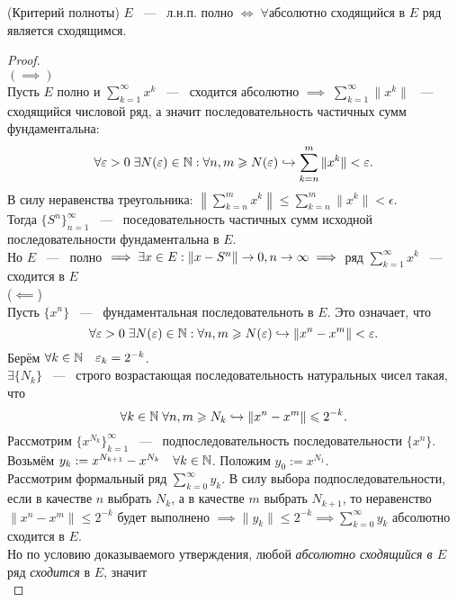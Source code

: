 \begin{theorem}
	(Критерий полноты) $E$ ~---~ л.н.п. полно $\Longleftrightarrow\; \forall$абсолютно сходящийся в $E$ ряд является сходящимся.
\end{theorem}
\begin{proof}\ \\
	$(\implies)$\\

    Пусть $E$ полно и $\sum\limits_{k=1}^\infty x^k$ ~---~ сходится абсолютно $\implies\; \sum\limits_{k=1}^\infty \|x^k\|$ ~---~ сходящийся числовой ряд, а значит последовательность частичных сумм фундаментальна: \[
			\forall \varepsilon > 0\; \exists N(\varepsilon) \in \mathbb{N}:\forall n,m \geqslant N(\varepsilon) \hookrightarrow \sum_{k=n}^{m} \|x^k\| < \varepsilon.
		\]
		В силу неравенства треугольника: $\left\|\sum\limits_{k=n}^m x^k\right\| \leq \sum\limits_{k=n}^m \|x^k\| < \epsilon$. \\
		Тогда $ \{S^n\}_{n=1}^\infty$ ~---~ поседовательность частичных сумм исходной последовательности фундаментальна в $E$.\\
		Но $E$ ~---~ полно $\implies \exists x \in E: \|x - S^n\| \rightarrow 0, n \rightarrow \infty \implies$ ряд $\sum\limits_{k=1}^\infty x^k$ ~---~ сходится в $E$\\
	($\impliedby$)\\
		Пусть $\{x^n\}$ ~---~ фундаментальная последовательноть в $E$. Это означает, что
		\[\forall \varepsilon > 0\; \exists N(\varepsilon) \in \mathbb{N}: \forall n, m \geqslant N(\varepsilon) \hookrightarrow \|x^n - x^m\| < \varepsilon.\]
		Берём $\forall k \in \mathbb{N}\quad \varepsilon_k = 2^{-k}$.\\
		$\exists \{N_k\}$ ~---~ строго возрастающая последовательность натуральных чисел такая, что \[
			\forall k \in \mathbb{N}\; \forall n, m \geqslant N_k \hookrightarrow \|x^n - x^m\| \leqslant 2^{-k}.
		\]
		Рассмотрим $\{x^{N_k}\}_{k=1}^\infty$ ~---~ подпоследовательность последовательности $\{x^n\}$.\\
		Возьмём $y_k := x^{N_{k+1}} - x^{N_k}\quad \forall k \in \mathbb{N}$. Положим $y_0 := x^{N_1}$.\\
		Рассмотрим формальный ряд $\sum\limits_{k=0}^\infty y_k$. В силу выбора подпоследовательности, если в качестве $n$ выбрать $N_k$, а в качестве $m$ выбрать $N_{k+1}$, то неравенство $\|x^n - x^m\| \leq 2^{-k}$ будет выполнено $\implies \|y_k\| \leq 2^{-k} \implies \sum\limits_{k=0}^\infty y_k$ абсолютно сходится в $E$.\\
		Но по условию доказываемого утверждения, любой \textit{абсолютно сходящийся в $E$} ряд \textit{сходится} в $E$, значит\\

\end{proof}
